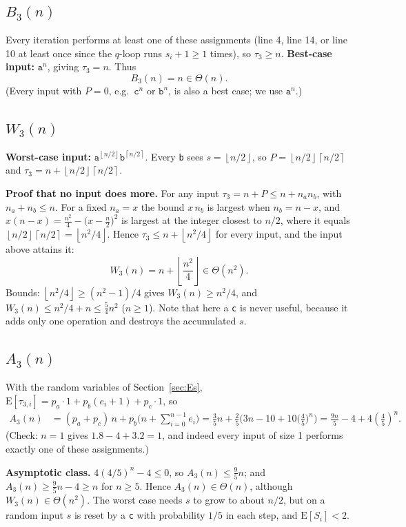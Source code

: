 \documentclass[11pt]{article}
\theoremstyle{remark}
\newcommand{\fl}[1]{\left\lfloor #1\right\rfloor}
\newcommand{\cl}[1]{\left\lceil #1\right\rceil}
\newcommand{\E}{\mathrm{E}}
\newcommand{\ta}{\texttt{a}}
\newcommand{\tb}{\texttt{b}}
\newcommand{\tc}{\texttt{c}}
\begin{document}
\subsection{$B_3(n)$}
Every iteration performs at least one of these assignments (line 4, line 14, or line 10 at least once since the
$q$-loop runs $s_i+1\ge 1$ times), so $\tau_3\ge n$. \textbf{Best-case input:} $\ta^n$, giving $\tau_3=n$. Thus
\[
B_3(n)=n\in\Theta(n).
\]
(Every input with $P=0$, e.g.\ $\tc^n$ or $\tb^n$, is also a best case; we use $\ta^n$.)

\subsection{$W_3(n)$}
\textbf{Worst-case input:} $\ta^{\fl{n/2}}\tb^{\cl{n/2}}$. Every \tb{} sees $s=\fl{n/2}$, so
$P=\fl{n/2}\cl{n/2}$ and $\tau_3=n+\fl{n/2}\cl{n/2}$.

\textbf{Proof that no input does more.} For any input $\tau_3=n+P\le n+n_an_b$, with $n_a+n_b\le n$. For a fixed
$n_a=x$ the bound $x\,n_b$ is largest when $n_b=n-x$, and
$x(n-x)=\frac{n^2}{4}-\big(x-\frac n2\big)^2$ is largest at the integer closest to $n/2$, where it equals
$\fl{n/2}\cl{n/2}=\fl{n^2/4}$. Hence $\tau_3\le n+\fl{n^2/4}$ for every input, and the input above attains it:
\[
W_3(n)=n+\left\lfloor\frac{n^2}{4}\right\rfloor\in\Theta(n^2).
\]
Bounds: $\fl{n^2/4}\ge (n^2-1)/4$ gives $W_3(n)\ge n^2/4$, and $W_3(n)\le n^2/4+n\le\frac54 n^2$ ($n\ge1$).
Note that here a \tc{} is never useful, because it adds only one operation and destroys the accumulated $s$.

\subsection{$A_3(n)$}
With the random variables of Section~\ref{sec:Es},
$\E[\tau_{3,i}] = p_a\cdot 1+p_b(e_i+1)+p_c\cdot1$, so
\begin{align*}
A_3(n)&=(p_a+p_c)\,n+p_b\Big(n+\sum_{i=0}^{n-1}e_i\Big)
=\frac35 n+\frac25\Big(3n-10+10\big(\tfrac45\big)^n\Big)
=\frac{9n}{5}-4+4\left(\frac45\right)^{n}.
\end{align*}
(Check: $n=1$ gives $1.8-4+3.2=1$, and indeed every input of size 1 performs exactly one of these assignments.)

\textbf{Asymptotic class.} $4(4/5)^n-4\le 0$, so $A_3(n)\le\frac95n$; and $A_3(n)\ge\frac95n-4\ge n$ for $n\ge5$.
Hence $A_3(n)\in\Theta(n)$, although $W_3(n)\in\Theta(n^2)$. The worst case needs $s$ to grow to about $n/2$, but on a
random input $s$ is reset by a \tc{} with probability $1/5$ in each step, and $\E[S_i]<2$.
\end{document}
